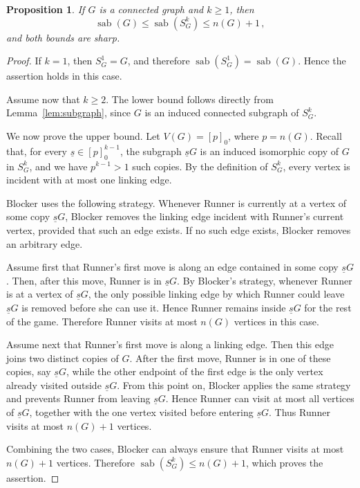 \documentclass[10pt,a4paper]{amsart}
\newtheorem{proposition}[theorem]{Proposition}
\DeclareMathOperator{\sab}{\mathrm{sab}}
\begin{document}
\begin{proposition}
\label{prp:generalized-sierpinski-bounds}
If $G$ is a connected graph and $k \geq 1$, then 
$$\sab(G) \leq \sab(S^k_G) \leq n(G)+1\, ,$$
and both bounds are sharp.
\end{proposition}

\begin{proof}
If $k=1$, then $S^1_G=G$, and therefore $\sab(S_G^1)=\sab(G)$. Hence the assertion holds in this case.

Assume now that $k\ge 2$. The lower bound follows directly from Lemma~\ref{lem:subgraph}, since
$G$ is an induced connected subgraph of $S_G^k$.

We now prove the upper bound. Let $V(G)=[p]_0$, where $p=n(G)$. Recall that, for every
$\underline{s}\in[p]_0^{k-1}$, the subgraph $\underline{s}G$ is an induced isomorphic copy of $G$ in $S_G^k$, and we have $p^{k-1} > 1$ such copies. By the definition of $S_G^k$, every vertex is incident with at most one linking edge.

Blocker uses the following strategy. Whenever Runner is currently at a vertex
of some copy $\underline{s}G$, Blocker removes the linking edge incident with
Runner's current vertex, provided that such an edge exists. If no such edge exists,
Blocker removes an arbitrary edge.

Assume first that Runner's first move is along an edge contained in some copy
$\underline{s}G$. Then, after this move, Runner is in $\underline{s}G$. By Blocker's
strategy, whenever Runner is at a vertex of $\underline{s}G$, the only possible linking edge by which Runner could leave $\underline{s}G$ is removed before she can use it. Hence Runner remains inside $\underline{s}G$ for the rest of the game. Therefore
Runner visits at most $n(G)$ vertices in this case.

Assume next that Runner's first move is along a linking edge. Then this edge
joins two distinct copies of $G$. After the first move, Runner is in one of these
copies, say $\underline{s}G$, while the other endpoint of the first edge is the only
vertex already visited outside $\underline{s}G$. From this point on, Blocker applies
the same strategy and prevents Runner from leaving $\underline{s}G$. Hence Runner
can visit at most all vertices of $\underline{s}G$, together with the one vertex
visited before entering $\underline{s}G$. Thus Runner visits at most $n(G)+1$
vertices.

Combining the two cases, Blocker can always ensure that Runner visits at most
$n(G)+1$ vertices. Therefore $\sab(S_G^k)\le n(G)+1$, which proves the assertion.


\end{proof}
\end{document}
